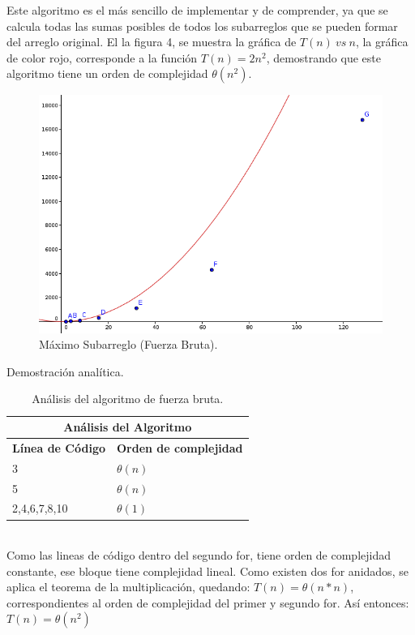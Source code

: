 \documentclass[12pt]{report}
\begin{document}
Este algoritmo es el más sencillo de implementar y de comprender, ya que se calcula todas las sumas posibles de todos los subarreglos que se pueden formar del arreglo original. El la figura 4, se muestra la gráfica de $T(n) \ vs \ n$, la gráfica de color rojo, corresponde a la función $T(n)=2n^{2}$, demostrando que este algoritmo tiene un orden de complejidad $\theta (n^{2})$.
	
	\begin{figure}[H]
		\includegraphics[width=12cm]{imagenes/4.png}
		\centering
		\caption{Máximo Subarreglo (Fuerza Bruta).}
		\centering
	\end{figure}	
	
Demostración analítica.\newline
	\begin{table}[htbp]
		\begin{center}
			\begin{tabular}{|l|l|}
				\hline
				\multicolumn{2}{|c|}{Análisis del Algoritmo} \\ 
				\hline
				\textbf{Línea de Código} & \textbf{Orden de complejidad}\\
				\hline
				3 & $\theta (n)$ \\ \hline
				5 & $\theta (n)$ \\ \hline
				2,4,6,7,8,10 & $\theta (1)$ \\ \hline
			\end{tabular}
			\caption{Análisis del algoritmo de fuerza bruta.}
			\label{tabla:analisis4}
		\end{center}
	\end{table}\\
	
	Como las lineas de código dentro del segundo for, tiene orden de complejidad constante, ese bloque tiene complejidad lineal.\newline
	Como existen dos for anidados, se aplica el teorema de la multiplicación, quedando: \newline
	$T(n)=\theta (n*n)$, correspondientes al orden de complejidad del primer y segundo for. Así entonces:
	$T(n)= \theta (n^{2})$\\
\end{document}
